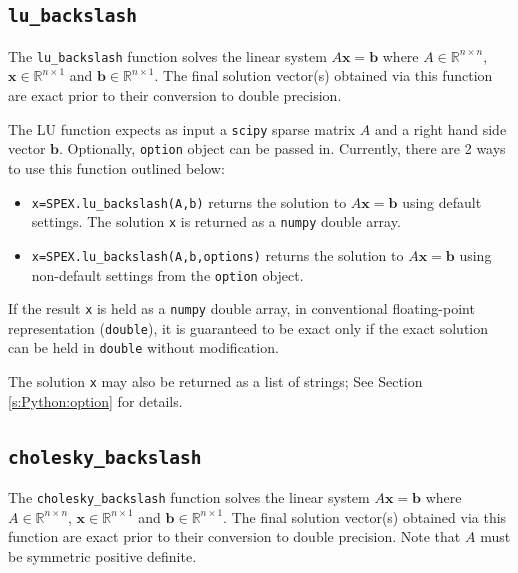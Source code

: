 \documentclass[12pt,oneside]{book}
\theoremstyle{definition}
\renewcommand{\b}{\mathbf{b}}
\newcommand{\x}{\mathbf{x}}
\begin{document}
\subsection{\texttt{lu\_backslash}}
The \verb|lu_backslash| function solves the linear system $A\x=\b$ where $A \in \mathbb{R}^{n \times n}$, $\x \in \mathbb{R}^{n \times 1}$ and $\b \in \mathbb{R}^{n \times 1}$. The final solution vector(s) obtained via this function are exact prior to their conversion to double precision. 

The LU function expects as input a \verb|scipy| sparse matrix $A$ and a right hand side vector $\b$. Optionally, \verb|option| object can be passed in.
Currently, there are 2 ways to use this function outlined below:

\begin{itemize}
    \item \verb|x=SPEX.lu_backslash(A,b)| returns the solution to $A \x = \b$ using default settings. The solution \verb|x| is returned as a \verb|numpy| double array.
    \item \verb|x=SPEX.lu_backslash(A,b,options)| returns the solution to $A \x = \b$ using non-default settings from the \verb|option| object.
\end{itemize}

If the result \verb|x| is held as a \verb|numpy| double array, in conventional floating-point representation (\verb|double|), it is guaranteed to be exact only if the exact solution can be held in \verb|double| without modification.

The solution \verb|x| may also be returned as a list of strings; See Section \ref{s:Python:option} for details.


\subsection{\texttt{cholesky\_backslash}}
The \verb|cholesky_backslash| function solves the linear system $A\x=\b$ where $A \in \mathbb{R}^{n \times n}$, $\x \in \mathbb{R}^{n \times 1}$ and $\b \in \mathbb{R}^{n \times 1}$. The final solution vector(s) obtained via this function are exact prior to their conversion to double precision. Note that $A$ must be symmetric positive definite.
\end{document}
